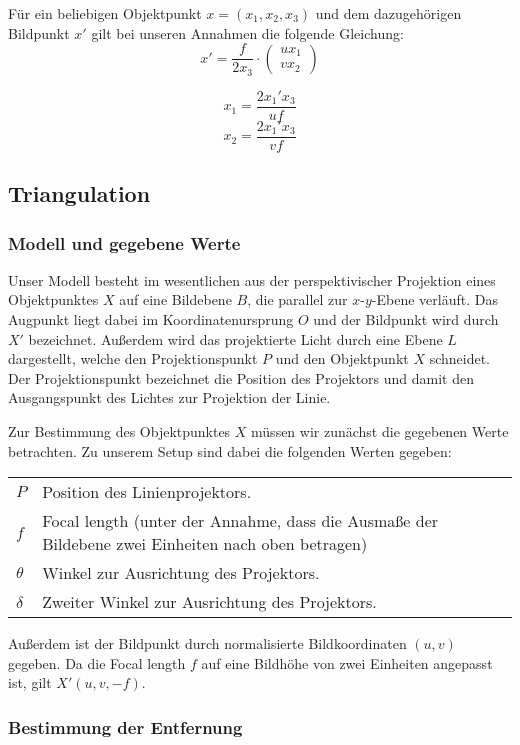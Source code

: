 \documentclass[ngerman,a4paper]{scrartcl}
\begin{document}
Für ein beliebigen Objektpunkt $x = (x_1, x_2, x_3)$ und dem dazugehörigen Bildpunkt $x'$ gilt bei unseren Annahmen die folgende Gleichung:
\[ x' = \frac{f}{2 x_3} \cdot \begin{pmatrix}
u x_1\\v x_2
\end{pmatrix} \]

\[ x_1 = \frac{2 x_1' x_3}{u f} \]
\[ x_2 = \frac{2 x_1' x_3}{v f} \]

\subsection{Triangulation}

\subsubsection{Modell und gegebene Werte}

Unser Modell besteht im wesentlichen aus der perspektivischer Projektion eines Objektpunktes $X$ auf eine Bildebene $B$, die parallel zur $x$-$y$-Ebene verläuft. Das Augpunkt liegt dabei im Koordinatenursprung $O$ und der Bildpunkt wird durch $X'$ bezeichnet. Außerdem wird das projektierte Licht durch eine Ebene $L$ dargestellt, welche den Projektionspunkt $P$ und den Objektpunkt $X$ schneidet. Der Projektionspunkt bezeichnet die Position des Projektors und damit den Ausgangspunkt des Lichtes zur Projektion der Linie.

Zur Bestimmung des Objektpunktes $X$ müssen wir zunächst die gegebenen Werte betrachten. Zu unserem Setup sind dabei die folgenden Werten gegeben:

\begin{tabular}{lp{12cm}}
	$P$       & Position des Linienprojektors.\\
	$f$       & Focal length (unter der Annahme, dass die Ausmaße der Bildebene zwei Einheiten nach oben betragen)\\
	$\theta$  & Winkel zur Ausrichtung des Projektors.\\
	$\delta$  & Zweiter Winkel zur Ausrichtung des Projektors.
\end{tabular}

Außerdem ist der Bildpunkt durch normalisierte Bildkoordinaten $(u, v)$ gegeben. Da die Focal length $f$ auf eine Bildhöhe von zwei Einheiten angepasst ist, gilt $X'(u, v, -f)$.

\subsubsection{Bestimmung der Entfernung}
\end{document}
